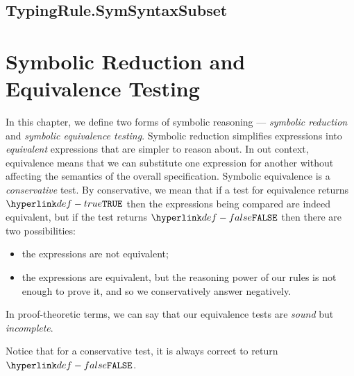\documentclass{book}
\begin{document}
\section{TypingRule.SymSyntaxSubset}
\hypertarget{def-symsyntaxsubset}{}

\chapter{Symbolic Reduction and Equivalence Testing \label{chap:symbolicequivalencetesting}}

In this chapter, we define two forms of symbolic reasoning ---
\emph{symbolic reduction} and \emph{symbolic equivalence testing}.
Symbolic reduction simplifies expressions into \emph{equivalent} expressions
that are simpler to reason about.
In out context, equivalence means that we can substitute one expression for another without
affecting the semantics of the overall specification.
%
Symbolic equivalence is a \emph{conservative} test.
By conservative, we mean that if a test for equivalence returns $\True$ then the expressions
being compared are indeed equivalent, but if the test returns $\False$ then
there are two possibilities:
\begin{itemize}
  \item the expressions are not equivalent;
  \item the expressions are equivalent, but the reasoning power of our rules
  is not enough to prove it, and so we conservatively answer negatively.
\end{itemize}
In proof-theoretic terms, we can say that our equivalence tests are \emph{sound} but \emph{incomplete}.

Notice that for a conservative test, it is always correct to return $\False$.
\end{document}
